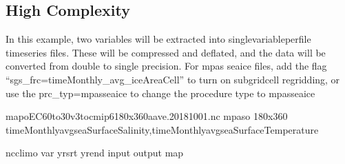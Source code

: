 \documentclass[letterpaper,10pt,english]{sphinxmanual}
\begin{document}
\subsection{High Complexity}
\label{\detokenize{mpas_regrid:high-complexity}}
In this example, two variables will be extracted into single\sphinxhyphen{}variable\sphinxhyphen{}per\sphinxhyphen{}file time\sphinxhyphen{}series files.
These will be compressed and deflated, and the data will be converted from double to single precision.
For mpas sea\sphinxhyphen{}ice files, add the flag “\textendash{}sgs\_frc=timeMonthly\_avg\_iceAreaCell” to turn on sub\sphinxhyphen{}grid\sphinxhyphen{}cell regridding,
or use the \textendash{}prc\_typ=mpasseaice to change the procedure type to mpas\sphinxhyphen{}sea\sphinxhyphen{}ice

\begin{sphinxVerbatim}[commandchars=\\\{\}]
map\PYGZus{}oEC60to30v3\PYGZus{}to\PYGZus{}cmip6\PYGZus{}180x360\PYGZus{}aave.20181001.nc                       
mpaso                                                                    
180x360                                                                 
timeMonthly\PYGZus{}avg\PYGZus{}seaSurfaceSalinity,timeMonthly\PYGZus{}avg\PYGZus{}seaSurfaceTemperature   
                                                                      
                                                                        
                                            

ncclimo 
   
  \PYGZhy{}\PYGZhy{}var 
  \PYGZhy{}\PYGZhy{}yr\PYGZus{}srt 
  \PYGZhy{}\PYGZhy{}yr\PYGZus{}end 
  \PYGZhy{}\PYGZhy{}input 
  \PYGZhy{}\PYGZhy{}output 
  \PYGZhy{}\PYGZhy{}map
\end{sphinxVerbatim}



\renewcommand{\indexname}{Index}
\printindex
\end{document}
